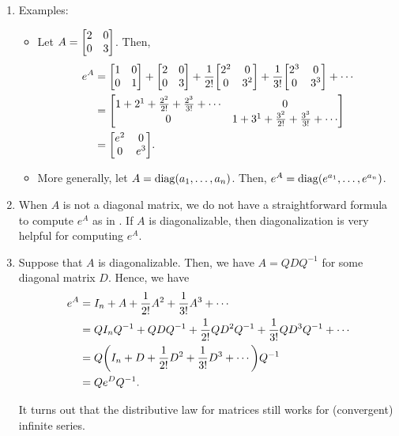 \begin{enumerate}
\item \label{it:matx-expo-eg} Examples:
\begin{itemize}
\item Let \(A=\mqty[2&0\\ 0&3]\). Then,
\begin{align*}
e^A&=\mqty[1&0\\ 0&1]+\mqty[2&0\\ 0&3]+\frac{1}{2!}\mqty[2^2&0\\ 0&3^2]
+\frac{1}{3!}\mqty[2^3&0\\ 0&3^3]+\dotsb \\
&=\mqty[1+2^1+\frac{2^{2}}{2!}+\frac{2^{3}}{3!}+\dotsb&0\\ 
0&1+3^1+\frac{3^{2}}{2!}+\frac{3^{3}}{3!}+\dotsb] \\
&=\mqty[e^{2}&0\\
0&e^{3}].
\end{align*}
\item More generally, let \(A=\operatorname{diag}(a_1,\dotsc,a_n)\). Then,
\(e^A=\operatorname{diag}(e^{a_1},\dotsc,e^{a_n})\).
\end{itemize}

\item When \(A\) is not a diagonal matrix, we do not have a straightforward
formula to compute \(e^A\) as in . If \(A\) is
diagonalizable, then diagonalization is very helpful for computing \(e^A\).

\item \label{it:cpt-matx-expo-diag} Suppose that \(A\) is diagonalizable. Then,
we have \(A=QDQ^{-1}\) for some diagonal matrix \(D\). Hence, we have
\begin{align*}
e^A&=I_n+A+\frac{1}{2!}A^2+\frac{1}{3!}A^{3}+\dotsb \\
&=QI_nQ^{-1}+QDQ^{-1}+\frac{1}{2!}QD^2Q^{-1}+\frac{1}{3!}QD^{3}Q^{-1}+\dotsb \\
&=Q\qty(I_n+D+\frac{1}{2!}D^2+\frac{1}{3!}D^{3}+\dotsb)Q^{-1} \\
&=Qe^DQ^{-1}.
\end{align*}
\begin{note}
It turns out that the distributive law for matrices still works for
(convergent) infinite series.
\end{note}
\end{enumerate}
